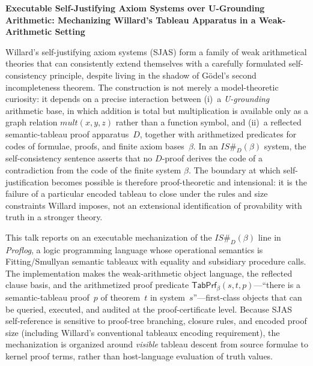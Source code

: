 \documentclass[11pt]{article}
\begin{document}
\noindent
\textbf{Executable Self-Justifying Axiom Systems over U-Grounding Arithmetic:
Mechanizing Willard's Tableau Apparatus in a Weak-Arithmetic Setting}

\medskip
\noindent
Willard's self-justifying axiom systems (SJAS) form a family of weak
arithmetical theories that can consistently extend themselves with a
carefully formulated self-consistency principle, despite living in the
shadow of G\"odel's second incompleteness theorem.
The construction is not merely a model-theoretic curiosity: it depends on a
precise interaction between (i)~a \emph{U-grounding} arithmetic base, in
which addition is total but multiplication is available only as a graph
relation $\mathit{mult}(x,y,z)$ rather than a function symbol, and (ii)~a
reflected semantic-tableau proof apparatus~$D$, together with arithmetized
predicates for codes of formulae, proofs, and finite axiom bases~$\beta$.
In an $IS\#_D(\beta)$ system, the self-consistency sentence asserts that no
$D$-proof derives the code of a contradiction from the code of the finite
system $\beta$.
The boundary at which self-justification becomes possible is therefore
proof-theoretic and intensional: it is the failure of a particular encoded
tableau to close under the rules and size constraints Willard imposes, not
an extensional identification of provability with truth in a stronger
theory.

\smallskip
\noindent
This talk reports on an executable mechanization of the $IS\#_D(\beta)$ line
in \emph{Proflog}, a logic programming language whose operational semantics
is Fitting/Smullyan semantic tableaux with equality and subsidiary
procedure calls.
The implementation makes the weak-arithmetic object language, the reflected
clause basis, and the arithmetized proof predicate
$\mathsf{TabPrf}_\beta(s,t,p)$---``there is a semantic-tableau proof~$p$ of
theorem~$t$ in system~$s$''---first-class objects that can be queried,
executed, and audited at the proof-certificate level.
Because SJAS self-reference is sensitive to proof-tree branching, closure
rules, and encoded proof size (including Willard's conventional tableaux
encoding requirement), the mechanization is organized around \emph{visible}
tableau descent from source formulae to kernel proof terms, rather than
host-language evaluation of truth values.
\end{document}
